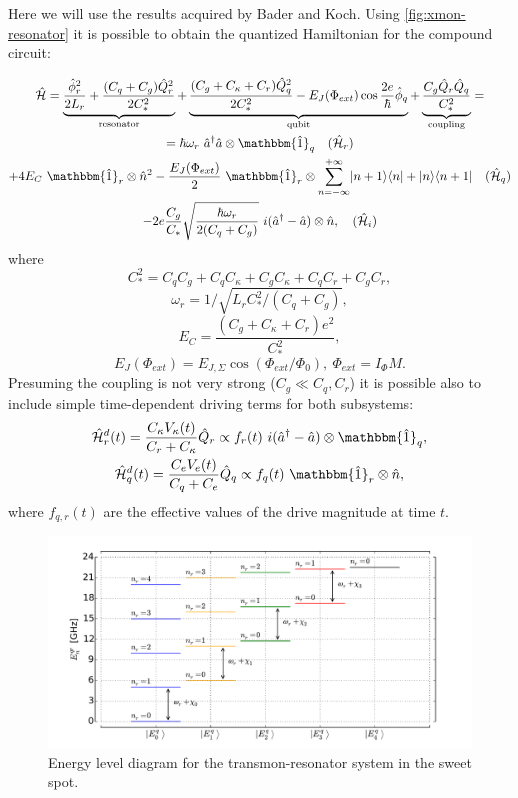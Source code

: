 \documentclass[12pt]{report}
\DeclarePairedDelimiter\bra{\langle}{\rvert}
\DeclarePairedDelimiter\ket{\lvert}{\rangle}
\numberwithin{equation}{section}
\begin{document}
Here we will use the results acquired by Bader\cite{Bader2013} and Koch\cite{Koch2007}. Using \autoref{fig:xmon-resonator} it is possible to obtain the quantized Hamiltonian for the compound circuit:

\begin{equation}
\begin{gathered}
\mathcal{\hat H} =  \underbrace{\frac{\hat \phi_r^2}{2 L_r} + \frac{(C_q+C_g) \hat Q_r^2}{2C_*^2}}_\text{resonator} 
+ \underbrace{\frac{(C_g + C_\kappa + C_r) \hat Q^2_q}{2C_*^2} - E_J (\Phi_{ext}) \cos \frac{2e}{\hbar}\hat \phi_q }_\text{qubit}
+ \underbrace{\frac{C_g\hat Q_r \hat Q_q}{C_*^2}}_\text{coupling} = \\
=  \hbar\omega_r\ \hat a^\dag \hat a \otimes \mathbbm{\hat 1}_q \quad (\mathcal{\hat H}_r) \\
+ 4 E_C\ \mathbbm{\hat 1}_r \otimes \hat n^2 - \frac{E_J(\Phi_{ext})}{2}\ \mathbbm{\hat 1}_r\otimes \sum_{n=-\infty}^{+\infty} \ket{n+1}\bra{n} + \ket{n}\bra{n+1} \quad (\mathcal{\hat H}_q) \\
- 2e \frac{C_g}{C_*} \sqrt{\frac{\hbar \omega_r }{2(C_q+C_g)}}\ i(\hat a^\dag - \hat a) \otimes \hat n, \quad (\mathcal{\hat H}_i)
\end{gathered}\label{eq:hamiltonian}
\end{equation}
where 
$$C_*^2 = C_q C_g + C_q C_\kappa + C_g C_\kappa + C_q C_r + C_g C_r, $$
$$\omega_r = 1/\sqrt{L_r C_*^2/(C_q+C_g)}, $$
$$E_C = \frac{(C_g+C_\kappa+C_r)e^2}{C_*^2}, $$
$$E_J(\Phi_{ext}) = E_{J,\Sigma} \cos(\Phi_{ext}/\Phi_0),\ \Phi_{ext} = I_\Phi M.$$
Presuming the coupling is not very strong ($C_g \ll C_q, C_r$) it is possible also to include simple time-dependent driving terms for both subsystems:
\begin{gather}
\mathcal{\hat H}_r^d(t) = \frac{C_\kappa V_\kappa(t)}{C_r + C_\kappa} \hat Q_r \propto f_r(t)\ i(\hat a^\dag - \hat a) \otimes \mathbbm{\hat 1}_q, \notag \\
\mathcal{\hat H}_q^d(t) = \frac{C_e V_e(t)}{C_q + C_e} \hat Q_q \propto f_q(t)\  \mathbbm{\hat 1}_r \otimes \hat n,
\label{eq:driving_q}
\end{gather}
where $f_{q, r} (t)$ are the effective values of the drive magnitude at time $t$.

\begin{figure}
\centering
\includegraphics[width=\textwidth]{diagram}
\caption{Energy level diagram for the transmon-resonator system in the sweet spot.}
\label{fig:diagram}
\end{figure}
\end{document}
